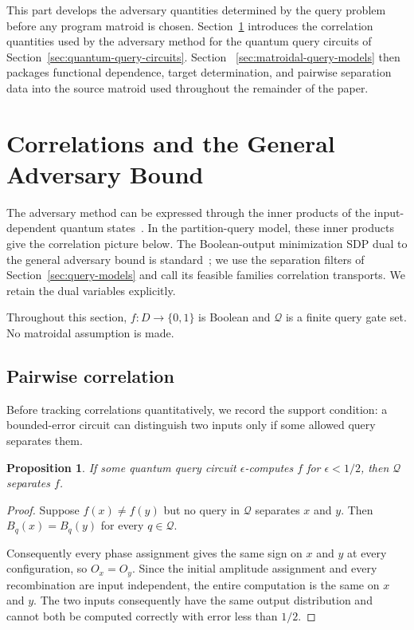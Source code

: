 \documentclass[11pt]{article}
\numberwithin{equation}{section}
\newtheorem{proposition}[definition]{Proposition}
\theoremstyle{remark}
\begin{document}
This part develops the adversary quantities determined by the query problem
before any program matroid is chosen. Section~\ref{sec:correlation-bounds}
introduces the correlation quantities used by the adversary method for the
quantum query circuits of Section~\ref{sec:quantum-query-circuits}. Section
~\ref{sec:matroidal-query-models} then packages functional dependence, target
determination, and pairwise separation data into the source matroid used
throughout the remainder of the paper.

\section{Correlations and the General Adversary Bound}
\label{sec:correlation-bounds}

The adversary method can be expressed through the inner products of the input-dependent quantum states~\cite{BarnumSaksSzegedy2003,HoyerLeeSpalek2007}. In the partition-query model, these inner products give the correlation picture below. The Boolean-output minimization SDP dual to the general adversary bound is standard~\cite{Reichardt2009}; we use the separation filters of Section~\ref{sec:query-models} and call its feasible families correlation transports. We retain the dual variables explicitly.

Throughout this section, $f:D\to\{0,1\}$ is Boolean and $\mathcal Q$ is a
finite query gate set.  No matroidal assumption is made.

\subsection{Pairwise correlation}
\label{subsec:correlation-separation}

Before tracking correlations quantitatively, we record the support
condition: a bounded-error circuit can distinguish two inputs only if some
allowed query separates them.

\begin{proposition}
\label{prop:quantum-separation-cover}
If some quantum query circuit $\epsilon$-computes $f$ for
$\epsilon<1/2$, then $\mathcal Q$ separates $f$.
\end{proposition}

\begin{proof}
Suppose $f(x)\neq f(y)$ but no query in $\mathcal Q$ separates $x$ and
$y$. Then $B_q(x)=B_q(y)$ for every $q\in\mathcal Q$.

Consequently every phase assignment gives the same sign on $x$ and $y$ at
every configuration, so $O_x=O_y$. Since the initial amplitude assignment
and every recombination are input independent, the entire computation is the
same on $x$ and $y$. The two inputs consequently have the same output
distribution and cannot both be computed correctly with error less than
$1/2$.
\end{proof}
\end{document}
